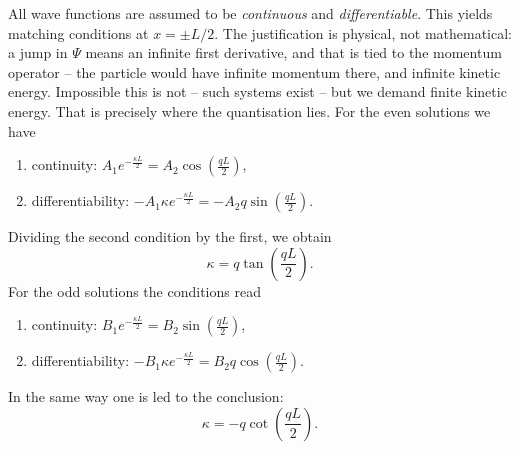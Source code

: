 All wave functions are assumed to be \emph{continuous} and \emph{differentiable}. This yields matching conditions at $x = \pm L/2$. The justification is physical, not mathematical: a jump in $\Psi$ means an infinite first derivative, and that is tied to the momentum operator -- the particle would have infinite momentum there, and infinite kinetic energy. Impossible this is not -- such systems exist -- but we demand finite kinetic energy. That is precisely where the quantisation lies. For the even solutions we have
\begin{enumerate}
	\item continuity: $A_1 e^{-\frac{\kappa L}{2}} = A_2 \cos\left(\frac{qL}{2}\right)$,
	\item differentiability: $-A_1\kappa e^{-\frac{\kappa L}{2}} = -A_2 q\sin\left(\frac{qL}{2}\right)$.
\end{enumerate}
Dividing the second condition by the first, we obtain
\begin{equation}\label{eq:symmcond}
	\kappa = q\tan\left(\frac{qL}{2}\right).
\end{equation}
For the odd solutions the conditions read  
\begin{enumerate}
	\item continuity: $B_1 e^{-\frac{\kappa L}{2}} = B_2 \sin\left(\frac{qL}{2}\right)$,
	\item differentiability: $-B_1\kappa e^{-\frac{\kappa L}{2}} = B_2 q\cos\left(\frac{qL}{2}\right)$.
\end{enumerate}
In the same way one is led to the conclusion:
\begin{equation}\label{eq:unsymm}
	\kappa = -q\cot\left(\frac{qL}{2}\right).
\end{equation}

